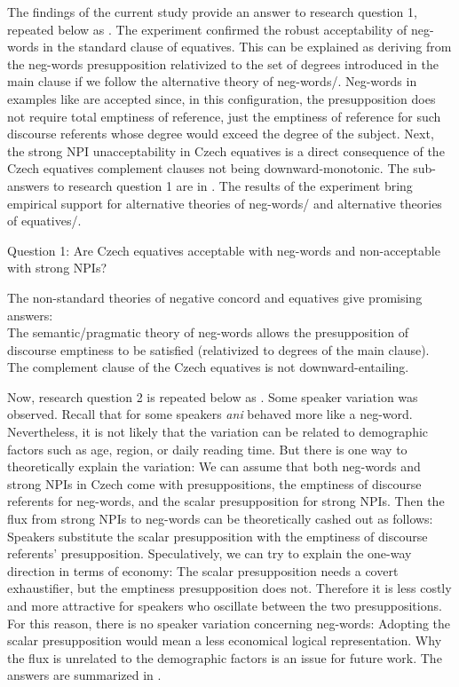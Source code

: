 \documentclass[output=paper,colorlinks,citecolor=brown]{langscibook}
\begin{document}
The findings of the current study provide an answer to research question 1, repeated below as . The experiment confirmed the robust acceptability of neg-words in the standard clause of equatives. This can be explained as deriving from the neg-words presupposition relativized to the set of degrees introduced in the main clause if we follow the alternative theory of neg-words/\citet{ovalle2004double}. Neg-words in examples like  are accepted since, in this configuration, the presupposition does not require total emptiness of reference, just the emptiness of reference for such discourse referents whose degree would exceed the degree of the subject. Next, the strong NPI unacceptability in Czech equatives is a direct consequence of the Czech equatives complement clauses not being downward-monotonic. The sub-answers to research question 1 are in . The results of the experiment bring empirical support for alternative theories of neg-words/\citet{ovalle2004double} and alternative theories of equatives/\citet{penka2016degree}.

\ea\label{ex-22} Question 1: Are Czech equatives acceptable with neg-words and
non-acceptable with strong NPIs?
\z

\ea\label{ex-23} The non-standard theories of negative concord and equatives give promising answers:\\
  \ea The semantic/pragmatic theory of neg-words allows the presupposition of discourse emptiness to be satisfied (relativized to degrees of the main clause).\\
  \ex The complement clause of the Czech equatives is not downward-entailing.\z\z

\noindent Now, research question 2 is repeated below as . Some speaker variation was observed. Recall that for some speakers \textit{ani} behaved more like a neg-word. Nevertheless, it is not likely that the variation can be related to demographic factors such as age, region, or daily reading time. But there is one way to theoretically explain the variation: We can assume that both neg-words and strong NPIs in Czech come with presuppositions, the emptiness of discourse referents for neg-words, and the scalar presupposition for strong NPIs. Then the flux from strong NPIs to neg-words can be theoretically cashed out as follows: Speakers substitute the scalar presupposition with the emptiness of discourse referents' presupposition. Speculatively, we can try to explain the one-way direction in terms of economy: The scalar presupposition needs a covert exhaustifier, but the emptiness presupposition does not. Therefore it is less costly and more attractive for speakers who oscillate between the two presuppositions.
For this reason, there is no speaker variation concerning neg-words: Adopting the scalar presupposition would mean a less economical logical representation. Why the flux is unrelated to the demographic factors is an issue for future work. The answers are summarized in . 
\end{document}
